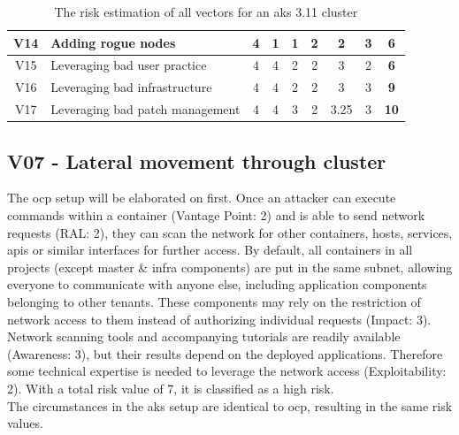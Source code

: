 \begin{landscape}
\begin{table}[]
{\begin{tabular}{|c|l|cccc|cc|c|}
V14             & Adding rogue nodes                                                                     & 4                                        & 1                              & 1                                        & 2                    & 2                                      & 3            & \textbf{6}           \\ \hline
V15             & Leveraging bad user practice                                                           & 4                                        & 4                              & 2                                        & 2                    & 3                                      & 2            & \textbf{6}           \\ \hline
V16             & Leveraging bad infrastructure                                                          & 4                                        & 4                              & 2                                        & 2                    & 3                                      & 3            & \textbf{9}           \\ \hline
V17             & Leveraging bad patch management                                                        & 4                                        & 4                              & 3                                        & 2                    & 3.25                                   & 3            & \textbf{10}          \\ \hline
\end{tabular}%
}
\caption{The risk estimation of all vectors for an \gls{aks} 3.11 cluster\label{aksRiskTable}}
\end{table}
\end{landscape}

\subsection{V07 - Lateral movement through cluster}

The \gls{ocp} setup will be elaborated on first. Once an attacker can execute commands within a container (Vantage Point: 2) and is able to send network requests (RAL: 2), they can scan the network for other containers, hosts, services, apis or similar interfaces for further access. By default, all containers in all projects (except master \& infra components) are put in the same subnet, allowing everyone to communicate with anyone else, including application components belonging to other tenants. These components may rely on the restriction of network access to them instead of authorizing individual requests (Impact: 3).
Network scanning tools and accompanying tutorials are readily available (Awareness: 3), but their results depend on the deployed applications. Therefore some technical expertise is needed to leverage the network access (Exploitability: 2). 
With a total risk value of 7, it is classified as a high risk. \\
The circumstances in the \gls{aks} setup are identical to \gls{ocp}, resulting in the same risk values.


